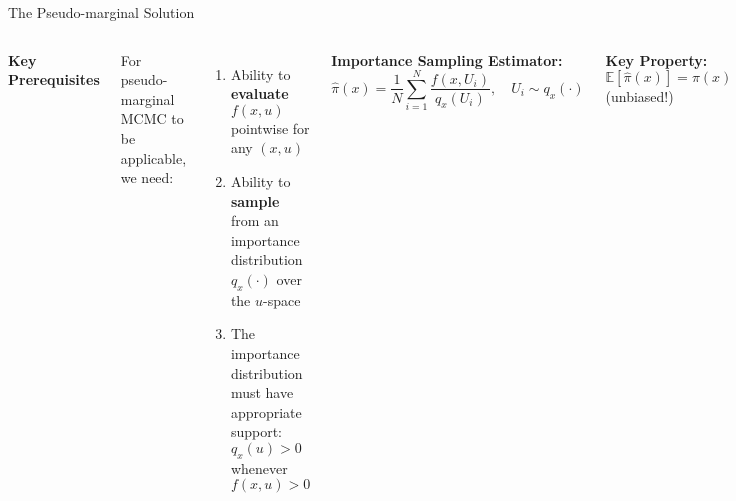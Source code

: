 \documentclass[aspectratio=169]{beamer}
\begin{document}
\begin{frame}{The Pseudo-marginal Solution}

\begin{columns}

        \textbf{Key Prerequisites}

        \vspace{0.2cm}
        For pseudo-marginal MCMC to be applicable, we need:
        \begin{enumerate}
        \item Ability to \textbf{evaluate} $f(x,u)$ pointwise for any $(x,u)$
        \item Ability to \textbf{sample} from an importance distribution $q_x(\cdot)$ over the $u$-space
        \item The importance distribution must have appropriate support: $q_x(u) > 0$ whenever $f(x,u) > 0$
        \end{enumerate}

        \textbf{Importance Sampling Estimator:}
        \begin{equation*}
        \hat{\pi}(x) = \frac{1}{N} \sum_{i=1}^{N} \frac{f(x,U_i)}{q_x(U_i)}, \quad U_i \sim q_x(\cdot)
        \end{equation*}

        \vspace{0.3cm}
        \textbf{Key Property:} $\mathbb{E}[\hat{\pi}(x)] = \pi(x)$ (unbiased!)

        \vspace{0.3cm}
        \textbf{The Magic:} Replace $\pi$ with $\hat{\pi}$ in MH ratio!
        \begin{equation*}
        \alpha = \min\left\{1, \frac{\hat{\pi}(y)q(y,x)}{\hat{\pi}(x)q(x,y)}\right\}
        \end{equation*}
        \vspace{0.3cm}
        \textcolor{copenhagenred}{\textbf{Result:}} Still targets correct $\pi(x)$!
        
\end{columns}
\end{frame}
\end{document}
